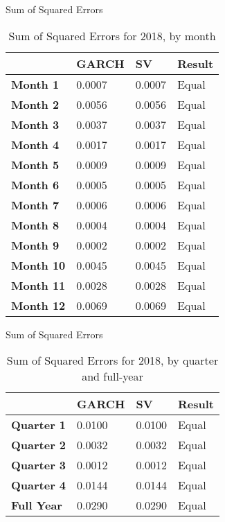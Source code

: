 \documentclass[11pt]{beamer}
\begin{document}
\begin{frame}{Sum of Squared Errors}
\begin{table}[!ht]
    \centering
    \begin{tabular}{|l|l|l|l|}
    \hline
        ~ & \textbf{GARCH} & \textbf{SV} & \textbf{Result} \\ \hline
        \textbf{Month 1} & 0.0007 & 0.0007 & Equal \\ \hline
        \textbf{Month 2} & 0.0056 & 0.0056 & Equal \\ \hline
        \textbf{Month 3} & 0.0037 & 0.0037 & Equal \\ \hline
        \textbf{Month 4} & 0.0017 & 0.0017 & Equal \\ \hline
        \textbf{Month 5} & 0.0009 & 0.0009 & Equal \\ \hline
        \textbf{Month 6} & 0.0005 & 0.0005 & Equal \\ \hline
        \textbf{Month 7} & 0.0006 & 0.0006 & Equal \\ \hline
        \textbf{Month 8} & 0.0004 & 0.0004 & Equal \\ \hline
        \textbf{Month 9} & 0.0002 & 0.0002 & Equal \\ \hline
        \textbf{Month 10} & 0.0045 & 0.0045 & Equal \\ \hline
        \textbf{Month 11} & 0.0028 & 0.0028 & Equal \\ \hline
        \textbf{Month 12} & 0.0069 & 0.0069 & Equal \\ \hline
    \end{tabular}
\caption{Sum of Squared Errors for 2018, by month}
\end{table}

\end{frame}


\begin{frame}{Sum of Squared Errors}
\begin{table}[!ht]
    \centering
    \begin{tabular}{|l|l|l|l|}
    \hline
        ~ & \textbf{GARCH} & \textbf{SV} & \textbf{Result} \\ \hline
           \textbf{Quarter 1} & 0.0100 & 0.0100 & Equal \\ \hline
        \textbf{Quarter 2} & 0.0032 & 0.0032 & Equal \\ \hline
        \textbf{Quarter 3} & 0.0012 & 0.0012 & Equal \\ \hline
        \textbf{Quarter 4} & 0.0144 & 0.0144 & Equal \\ \hline
        \textbf{Full Year} & 0.0290 & 0.0290 & Equal \\ \hline
    \end{tabular}
\caption{Sum of Squared Errors for 2018, by quarter and full-year}
\end{table}
\end{frame}
\end{document}
